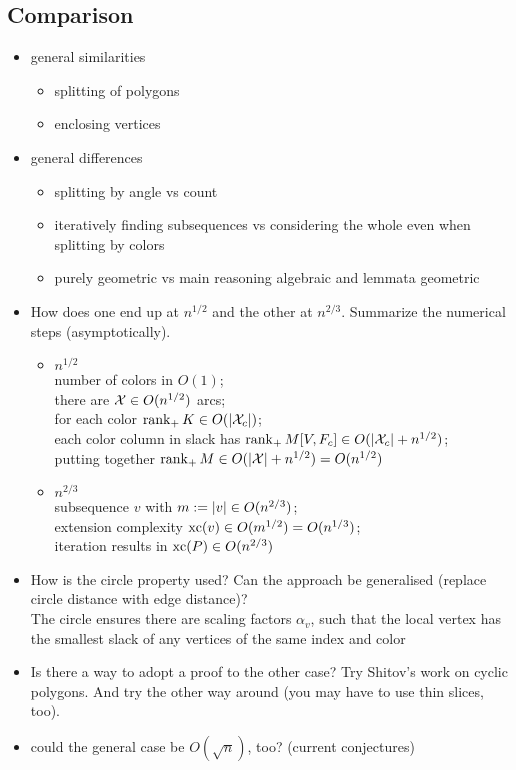 \subsection{Comparison}


\begin{itemize}
  \item general similarities 
  \begin{itemize}
    \item splitting of polygons
    \item enclosing vertices
  \end{itemize}
  \item general differences 
  \begin{itemize}
    \item splitting by angle vs count
    \item iteratively finding subsequences vs considering the whole even when splitting by colors
    \item purely geometric vs main reasoning algebraic and lemmata geometric
  \end{itemize}
  \item How does one end up at $n^{1/2}$ and the other at $n^{2/3}$. Summarize the numerical steps (asymptotically).
  \begin{itemize}
    \item $n^{1/2}$\\ 
    number of colors in $O(1)$;\\
    there are $\mathcal{X} \in O(n^{1/2})$ arcs;\\
    for each color $\operatorname{rank}_+ K \in O(\lvert\mathcal{X}_c\rvert)$;\\
    each color column in slack has $\operatorname{rank}_+ M[V,F_c] \in O(\lvert\mathcal{X}_c\rvert + n^{1/2})$;\\
    putting together $\operatorname{rank}_+ M \in O(\lvert\mathcal{X}\rvert + n^{1/2}) = O(n^{1/2})$
    \item $n^{2/3}$\\
    subsequence $v$ with $m := \lvert v\rvert \in O(n^{2/3})$;\\
    extension complexity $\operatorname{xc}(v) \in O(m^{1/2}) = O(n^{1/3})$;\\
    iteration results in $\operatorname{xc}(P) \in O(n^{2/3})$
  \end{itemize}
  \item How is the circle property used? Can the approach be generalised (replace circle distance with edge distance)?\\
  The circle ensures there are scaling factors $\alpha_v$, such that the local vertex has the smallest slack of any vertices of the same index and color
  \item Is there a way to adopt a proof to the other case? Try Shitov's work on cyclic polygons. And try the other way around (you may have to use thin slices, too).
  \item could the general case be $O(\sqrt{n})$, too? (current conjectures)
\end{itemize}
